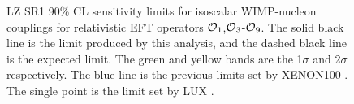 \begin{figure}[!htbp]
\caption{LZ SR1 90\% CL sensitivity limits for isoscalar WIMP-nucleon couplings for relativistic EFT operators $\operatorname{\mathcal{O}}_1$,$\operatorname{\mathcal{O}}_3$-$\operatorname{\mathcal{O}}_9$.
         The solid black line is the limit produced by this analysis, and the dashed black line is the expected limit. 
         The green and yellow bands are the 1$\sigma$ and 2$\sigma$ respectively.
         The blue line is the previous limits set by XENON100 \cite{xenon100_eft_ref}.
         The single point is the limit set by LUX \cite{LUX_RUN4_EFT_2021}. }
\label{fig:EFT_Result_SR1_Sensitivity_1}
\end{figure}


